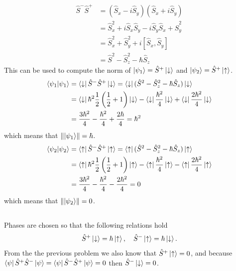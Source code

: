 \documentclass{article}
\begin{document}
\subsection{}
\begin{align*}
\hat{S}^-\hat{S}^+ &=(\hat{S}_x-i\hat{S}_y)(\hat{S}_x+i\hat{S}_y) \\
&= \hat{S}_x^2+i\hat{S}_x\hat{S}_y-i\hat{S}_y\hat{S}_x+\hat{S}_y^2 \\
&= \hat{S}_x^2+\hat{S}_y^2+i[\hat{S}_x,\hat{S}_y] \\
&= \hat{S}^2-\hat{S}_z^2-\hbar\hat{S}_z
\end{align*}
This can be used to compute the norm of $\ket{\psi_1} = \hat{S}^+\ket{\downarrow}$ and $\ket{\psi_2} = \hat{S}^+\ket{\uparrow}$.
\begin{align*}
\braket{\psi_1} &= \bra{\downarrow}\hat{S}^-\hat{S}^+\ket{\downarrow} = \bra{\downarrow}(\hat{S}^2-\hat{S}_z^2-\hbar\hat{S}_z)\ket{\downarrow} \\
&= \bra{\downarrow}\hbar^2\frac{1}{2}\left(\frac{1}{2} +1 \right)\ket{\downarrow} -\bra{\downarrow}\frac{\hbar^2}{4} \ket{\downarrow} +\bra{\downarrow}\frac{2\hbar^2}{4} \ket{\downarrow} \\
&= \frac{3\hbar^2}{4} -\frac{\hbar^2}{4}+\frac{2\hbar}{4} = \hbar^2 
\end{align*}
which means that $\norm{\ket{\psi_1}} = \hbar$.
\begin{align*}
\braket{\psi_2} &= \bra{\uparrow}\hat{S}^-\hat{S}^+\ket{\uparrow} = \bra{\uparrow}(\hat{S}^2-\hat{S}_z^2-\hbar\hat{S}_z)\ket{\uparrow} \\
&= \bra{\uparrow}\hbar^2\frac{1}{2}\left(\frac{1}{2} +1 \right)\ket{\uparrow} -\bra{\uparrow}\frac{\hbar^2}{4} \ket{\uparrow} -\bra{\uparrow}\frac{2\hbar^2}{4} \ket{\uparrow} \\
&= \frac{3\hbar^2}{4} -\frac{\hbar^2}{4}-\frac{2\hbar^2}{4} = 0
\end{align*}
which means that $\norm{\ket{\psi_2}} = 0$.

\subsection{}
Phases are chosen so that the following relations hold
\begin{equation*}
\hat{S}^+\ket{\downarrow}=\hbar\ket{\uparrow}, \quad \hat{S}^-\ket{\uparrow}=\hbar\ket{\downarrow}.
\end{equation*}
From the the previous problem we also know that $\hat{S}^+\ket{\uparrow}=0$, and because $\bra{\psi}\hat{S}^+\hat{S}^-\ket{\psi}=\bra{\psi}\hat{S}^-\hat{S}^+\ket{\psi}=0$ then $\hat{S}^-\ket{\downarrow}=0$.
\end{document}
